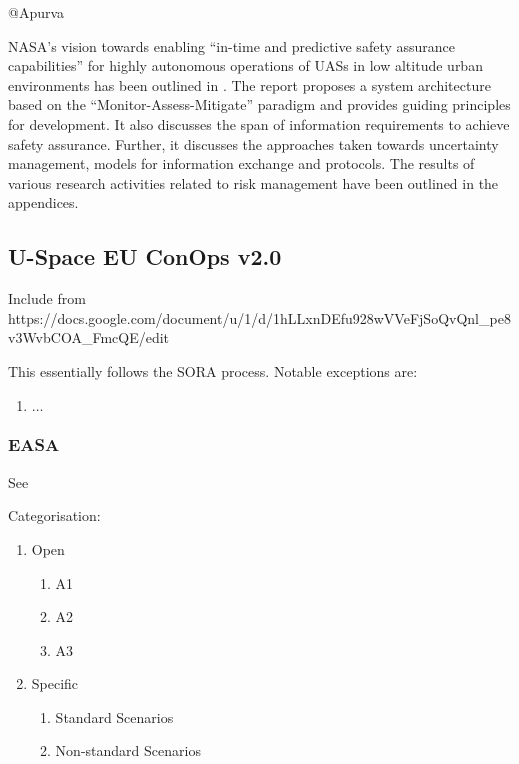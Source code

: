 \documentclass{ua_wgs_base}
\begin{document}
\begin{lyxgreyedout}
@Apurva%
\end{lyxgreyedout}

NASA\textquoteright s vision towards enabling \textquotedblleft in-time
and predictive safety assurance capabilities\textquotedblright{} for
highly autonomous operations of UASs in low altitude urban environments
has been outlined in \cite{NASA-TM-2020-220440}. The report proposes
a system architecture based on the \textquotedblleft Monitor-Assess-Mitigate\textquotedblright{}
paradigm and provides guiding principles for development. It also
discusses the span of information requirements to achieve safety assurance.
Further, it discusses the approaches taken towards uncertainty management,
models for information exchange and protocols. The results of various
research activities related to risk management have been outlined
in the appendices.

\subsection{U-Space EU ConOps v2.0}

\begin{lyxgreyedout}
Include from https://docs.google.com/document/u/1/d/1hLLxnDEfu928wVVeFjSoQvQnl\_pe8v3WvbCOA\_FmcQE/edit%
\end{lyxgreyedout}

This essentially follows the SORA process. Notable exceptions are:
\begin{enumerate}
\item $\ldots$
\end{enumerate}

\subsubsection{EASA}

See \cite{EASA-Op-2001-2018,EASA-Op-2005-2019,EASA-Ops-Categ,EASA-UAS-ATM-Assessment-2018}

Categorisation:
\begin{enumerate}
\item Open
\begin{enumerate}
\item A1
\item A2
\item A3
\end{enumerate}
\item Specific
\begin{enumerate}
\item Standard Scenarios
\item Non-standard Scenarios
\end{enumerate}
\end{enumerate}
\end{document}
